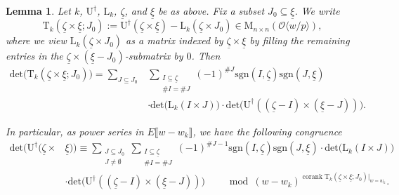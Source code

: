 \documentclass[12pt]{amsart}
\newtheorem{lemma}[subsection]{Lemma}
\theoremstyle{definition}
\numberwithin{equation}{subsection}
\def\calO{\mathcal{O}}
\def\rmL{\mathrm{L}}
\def\rmM{\mathrm{M}}
\def\rmU{\mathrm{U}}
\def\rmT{\mathrm{T}}
\renewcommand{\det}{\mathrm{det}}
\newcommand{\sgn}{\mathrm{sgn}}
\DeclareMathOperator{\corank}{corank}
\begin{document}
\begin{lemma}
\label{L:linear algebra facts}
Let $k$, $\rmU^\dagger$, $\rmL_k$, $\underline \zeta$, and $\underline \xi$ be as above.
Fix a subset $J_0 \subseteq \underline \xi$. We write 
$$\rmT_k(\underline \zeta \times \underline \xi; J_0):= \rmU^\dagger(\underline \zeta \times \underline \xi)- \rmL_k(\underline \zeta \times J_0) \in \rmM_{n \times n}(\calO\langle w/p\rangle),$$
where we view $\rmL_k(\underline \zeta \times J_0)$ as a matrix indexed by $\underline \zeta \times \underline \xi$ by filling the remaining entries in the $\underline \zeta \times (\underline \xi - J_0)$-submatrix by $0$. Then
\begin{align}
\label{E:det(U|T)}
\det \big(\rmT_k(\underline \zeta \times \underline \xi; J_0) \big)  
= \sum_{J \subseteq J_0}& \sum_{\substack{I \subseteq \underline \zeta\\ \# I = 
\# J}} (-1)^{\# J} \sgn (I, \underline \zeta) \sgn(J, \underline \xi)
\\ \nonumber & \cdot \det \big(\rmL_k(I \times J)\big) \cdot  \det\big( \rmU^\dagger((\underline \zeta - I) \times (\underline \xi-J))\big).
\end{align}

In particular,  as power series in $E\llbracket w-w_k\rrbracket$, we have the following congruence
\begin{align}
\label{E:cofactor expansion primitive}
\det \big(\rmU^\dagger(\underline \zeta \times& \underline \xi) \big)  \equiv 
\sum_{\substack{J \subseteq J_0\\ J \neq \emptyset }} \sum_{\substack{I 
\subseteq \underline \zeta\\ \# I = \# J}} (-1)^{\# J-1} \sgn (I, \underline 
\zeta) \sgn(J, \underline \xi)\cdot \det \big(\rmL_k(I \times J)\big) \\
\nonumber
& \cdot  \det\big( \rmU^\dagger((\underline \zeta - I) \times (\underline 
\xi-J))\big) \qquad \bmod (w-w_k)^{\corank \rmT_k(\underline \zeta 
\times \underline \xi; J_0)|_{w=w_k}}.
\end{align}
\end{lemma}
\end{document}
